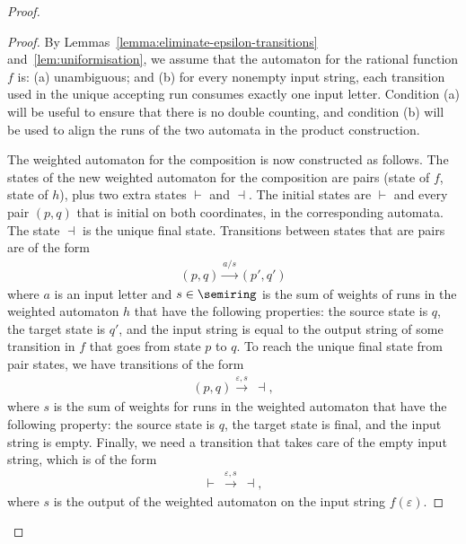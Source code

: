 \begin{proof}
\begin{proof}
        By Lemmas~\ref{lemma:eliminate-epsilon-transitions} and~\ref{lem:uniformisation}, we assume that the automaton for the rational function $f$ is: (a) unambiguous; and (b) for every nonempty input string, each transition used in the unique accepting run consumes exactly one input letter. Condition (a) will be useful to ensure that there is no double counting, and condition (b) will be used to align the runs of the two automata in the product construction.

        The weighted automaton for the composition is now constructed as follows.  
        The states of the new weighted automaton for the composition are pairs (state of $f$, state of $h$), plus two extra states $\vdash$ and  $\dashv$. The initial states are $\vdash$ and every pair $(p,q)$ that  is initial on both coordinates, in the corresponding automata. The state $\dashv$ is the unique final state. Transitions between states that are pairs are of the form
        \begin{align*}
        (p,q) \xrightarrow {a/s} (p',q')
        \end{align*}
        where $a$ is an input letter and $s \in \semiring$ is the sum of weights of runs in the weighted automaton $h$ that have the following properties: the source state is $q$, the target state is $q'$, and the input string is equal to the output string of some transition in $f$ that goes from state $p$ to $q$. To reach the unique final state from pair states, we have transitions of the form
        \begin{align*}
        (p,q) \xrightarrow {\varepsilon, s} \ \dashv,
        \end{align*}
        where $s$ is the sum of weights for runs in the weighted automaton that have the following property: the source state is $q$, the target state is final, and the input string is empty. Finally, we need a transition that takes care of the empty input string, which is of the form
        \begin{align*}
        \vdash\  \xrightarrow {\varepsilon, s}\  \dashv,
        \end{align*}
        where $s$ is the output of the weighted automaton on the input string $f(\varepsilon)$.
    \end{proof}
\end{proof}


